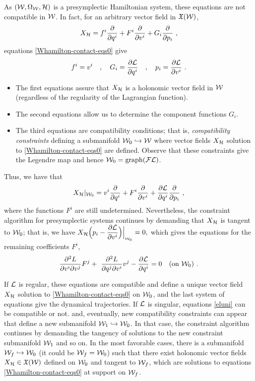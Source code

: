 \documentclass[12pt]{report}
\def\beq{\begin{equation}}
\def\eeq{\end{equation}}
\def\dst{\displaystyle}
\def\derpar#1#2{\frac{\partial{#1}}{\partial{#2}}}
\def\vf{\mathfrak X}
\def\Lag{{\cal L}}
\def\Leg{{\cal F}\Lag}
\begin{document}
As $({\cal W},\Omega_{\cal W},{\cal H})$ is a presymplectic Hamiltonian system,
these equations are not compatible in ${\cal W}$.
In fact, for an arbitrary vector field in $\vf({\cal W})$,
$$
X_{\cal H} =  f^i\derpar{}{q^i}+F^i\derpar{}{v^i}+G_i\derpar{}{p_i} \ ,
$$ 
equations \eqref{Whamilton-contact-eqs0} give
\beq
 f^i= v^i \quad , \quad
 G_i= \displaystyle \derpar{\Lag}{q^i} \quad ,  \quad
p_i= \derpar{\Lag}{v^i}  \ . 
\label{firstuni}
\eeq
\begin{itemize}
\item
The first equations assure that $X_{\cal H}$ is a holonomic vector field in ${\cal W}$
(regardless of the regularity of the Lagrangian function).
\item
The second equations allow us to determine the component functions $G_i$.
\item
The third equations are compatibility conditions;
that is, {\sl compatibility constraints} defining a submanifold 
${\cal W}_0\hookrightarrow{\cal W}$
where vector fields $X_{\cal H}$ solution to \eqref{Whamilton-contact-eqs0} are defined.
Observe that these constraints give the Legendre map and hence ${\cal W}_0={\rm graph}({\Leg})$.
\end{itemize}
Thus, we have that
$$
X_{\cal H} \vert_{{\cal W}_0}= v^i\derpar{}{q^i}+F^i\derpar{}{v^i}+
\derpar{\Lag}{q^i}\derpar{}{p_i}\ ,
$$
where the functions $F^i$ are still undetermined.
Nevertheless, the constraint algorithm for presymplectic systems continues by demanding that
$X_{\cal H}$ is tangent to ${\cal W}_0$; that is, we have
$\dst{X_{\cal H}\Big(p_i- \derpar{\Lag}{v^i}\Big)}\Big\vert_{_{{\cal W}_0}} = 0,$
which gives the equations for the remaining coefficients $F^i$,
\beq
 \frac{\partial^2L}{\partial v^i\partial v^j}F^j+ \ \frac{\partial^2L}{\partial q^j\partial v^i}v^j- \derpar{\Lag}{q^i}=0 \quad (\text{on } \mathcal{W}_0)  \ .
\label{eluni}
\eeq

If $\Lag$ is regular, these equations are compatible and define a unique vector field $X_{\cal H}$ solution to \eqref{Whamilton-contact-eqs0} on ${\cal W}_0$,
and the last system of equations give the dynamical trajectories.
If $\Lag$ is singular, equations \eqref{eluni} can be compatible or not.
and, eventually, new compatibility constraints can appear
that define a new submanifold ${\cal W}_1\hookrightarrow{\cal W}_0$.
In that case, the constraint algorithm continues by demanding the tangency of solutions to the new constraint submanifold ${\cal W}_1$ and so on. 
In the most favorable cases,
there is a submanifold ${\cal W}_f \hookrightarrow {\cal W}_0$ (it could be ${\cal W}_f = {\cal W}_0$)
such that there exist holonomic vector fields $X_{\cal H}\in\vf({\cal W})$ defined on ${\cal W}_0$ and tangent to ${\cal W}_f$,
which are solutions to equations \eqref{Whamilton-contact-eqs0}
at support on ${\cal W}_f$.
\end{document}
